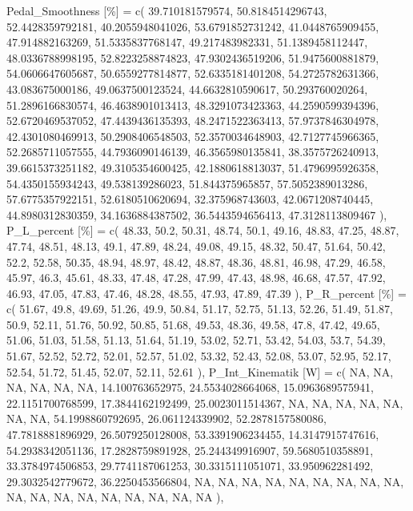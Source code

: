 \documentclass[
  letterpaper,
  DIV=11]{scrartcl}
\newenvironment{Shaded}{\begin{snugshade}}{\end{snugshade}}
\newcommand{\NormalTok}[1]{\textcolor[rgb]{0.00,0.23,0.31}{#1}}
\begin{document}
\begin{Shaded}
\begin{Highlighting}[]
\NormalTok{  \textasciigrave{}Pedal\_Smoothness [\%]\textasciigrave{} = c( 39.710181579574, 50.8184514296743, 52.4428359792181, 40.2055948041026, 53.6791852731242, 41.0448765909455, 47.914882163269, 51.5335837768147, 49.217483982331, 51.1389458112447, 48.0336788998195, 52.8223258874823, 47.9302436519206, 51.9475600881879, 54.0606647605687, 50.6559277814877, 52.6335181401208, 54.2725782631366, 43.083675000186, 49.0637500123524, 44.6632810590617, 50.293760020264, 51.2896166830574, 46.4638901013413, 48.3291073423363, 44.2590599394396, 52.6720469537052, 47.4439436135393, 48.2471522363413, 57.9737846304978, 42.4301080469913, 50.2908406548503, 52.3570034648903, 42.7127745966365, 52.2685711057555, 44.7936090146139, 46.3565980135841, 38.3575726240913, 39.6615373251182, 49.3105354600425, 42.1880618813037, 51.4796995926358, 54.4350155934243, 49.538139286023, 51.844375965857, 57.5052389013286, 57.6775357922151, 52.6180510620694, 32.375968743603, 42.0671208740445, 44.8980312830359, 34.1636884387502, 36.5443594656413, 47.3128113809467 ),}
\NormalTok{  \textasciigrave{}P\_L\_percent [\%]\textasciigrave{} = c( 48.33, 50.2, 50.31, 48.74, 50.1, 49.16, 48.83, 47.25, 48.87, 47.74, 48.51, 48.13, 49.1, 47.89, 48.24, 49.08, 49.15, 48.32, 50.47, 51.64, 50.42, 52.2, 52.58, 50.35, 48.94, 48.97, 48.42, 48.87, 48.36, 48.81, 46.98, 47.29, 46.58, 45.97, 46.3, 45.61, 48.33, 47.48, 47.28, 47.99, 47.43, 48.98, 46.68, 47.57, 47.92, 46.93, 47.05, 47.83, 47.46, 48.28, 48.55, 47.93, 47.89, 47.39 ),}
\NormalTok{  \textasciigrave{}P\_R\_percent [\%]\textasciigrave{} = c( 51.67, 49.8, 49.69, 51.26, 49.9, 50.84, 51.17, 52.75, 51.13, 52.26, 51.49, 51.87, 50.9, 52.11, 51.76, 50.92, 50.85, 51.68, 49.53, 48.36, 49.58, 47.8, 47.42, 49.65, 51.06, 51.03, 51.58, 51.13, 51.64, 51.19, 53.02, 52.71, 53.42, 54.03, 53.7, 54.39, 51.67, 52.52, 52.72, 52.01, 52.57, 51.02, 53.32, 52.43, 52.08, 53.07, 52.95, 52.17, 52.54, 51.72, 51.45, 52.07, 52.11, 52.61 ),}
\NormalTok{  \textasciigrave{}P\_Int\_Kinematik [W]\textasciigrave{} = c( NA, NA, NA, NA, NA, NA, 14.100763652975, 24.5534028664068, 15.0963689575941, 22.1151700768599, 17.3844162192499, 25.0023011514367, NA, NA, NA, NA, NA, NA, NA, 54.1998860792695, 26.061124339902, 52.2878157580086, 47.7818881896929, 26.5079250128008, 53.3391906234455, 14.3147915747616, 54.2938342051136, 17.2828759891928, 25.244349916907, 59.5680510358891, 33.3784974506853, 29.7741187061253, 30.3315111051071, 33.950962281492, 29.3032542779672, 36.2250453566804, NA, NA, NA, NA, NA, NA, NA, NA, NA, NA, NA, NA, NA, NA, NA, NA, NA, NA ),}

\end{Highlighting}
\end{Shaded}
\end{document}
